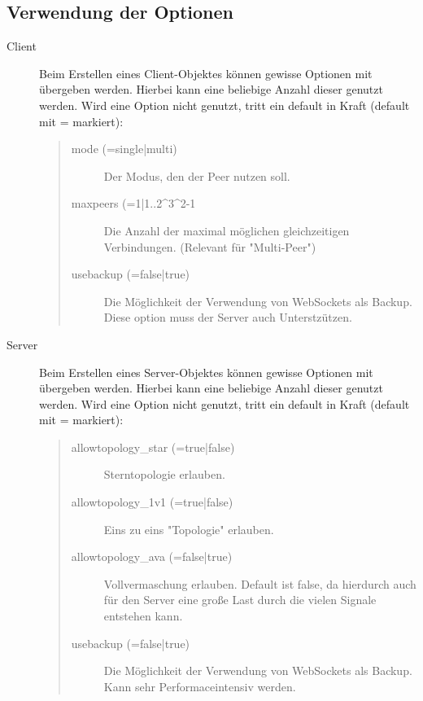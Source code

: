 \subsection{Verwendung der Optionen} \label{moduleoptions}
\begin{description}
\item[Client]
Beim Erstellen eines Client-Objektes können gewisse Optionen mit übergeben werden. Hierbei kann eine beliebige Anzahl dieser genutzt werden. Wird eine Option nicht genutzt, tritt ein default in Kraft (default mit = markiert):
\begin{quote}
  \begin{description}
  \item[mode (=single|multi)]
  Der Modus, den der Peer nutzen soll.
  
  \item[maxpeers (=1|1..2^3^2-1]
  Die Anzahl der maximal möglichen gleichzeitigen Verbindungen. (Relevant für "Multi-Peer")

  \item[usebackup (=false|true)]
  Die Möglichkeit der Verwendung von WebSockets als Backup. Diese option muss der Server auch Unterstzützen.
  \end{description}
\end{quote}

\item[Server]
Beim Erstellen eines Server-Objektes können gewisse Optionen mit übergeben werden.
Hierbei kann eine beliebige Anzahl dieser genutzt werden.
Wird eine Option nicht genutzt, tritt ein default in Kraft (default mit = markiert):
\begin{quote}
  \begin{description}
  \item[allowtopology_star (=true|false)]
  Sterntopologie erlauben.
  
  \item[allowtopology_1v1 (=true|false)]
  Eins zu eins "Topologie" erlauben.
  
  \item[allowtopology_ava (=false|true)]
  Vollvermaschung erlauben. Default ist false, da hierdurch auch für den Server eine große Last durch die vielen Signale entstehen kann.  
  
  \item[usebackup (=false|true)]
  Die Möglichkeit der Verwendung von WebSockets als Backup. Kann sehr Performaceintensiv werden.
  \end{description}
\end{quote}
\end{description}



